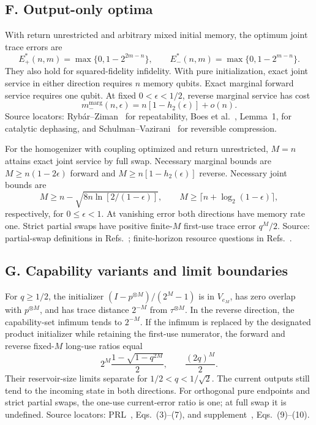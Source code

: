 \documentclass[11pt]{article}
\begin{document}
\noindent\begin{minipage}{\linewidth}
\subsection*{F. Output-only optima}
With return unrestricted and arbitrary mixed initial memory, the optimum joint trace errors are
\[
 E_+^*(n,m)=\max\{0,1-2^{2m-n}\},\qquad
 E_-^*(n,m)=\max\{0,1-2^{m-n}\}.
\]
They also hold for squared-fidelity infidelity. With pure initialization, exact joint service in either direction requires $n$ memory qubits. Exact marginal forward service requires one qubit. At fixed $0<\epsilon<1/2$, reverse marginal service has cost
\[
 m_-^{\mathrm{marg}}(n,\epsilon)=n[1-h_2(\epsilon)]+o(n).
\]
Source locators: Ryb\'{a}r--Ziman~\cite{rybar} for repeatability, Boes et al.~\cite{boes}, Lemma~1, for catalytic dephasing, and Schulman--Vazirani~\cite{sv} for reversible compression.

For the homogenizer with coupling optimized and return unrestricted, $M=n$ attains exact joint service by full swap. Necessary marginal bounds are $M\ge n(1-2\epsilon)$ forward and $M\ge n[1-h_2(\epsilon)]$ reverse. Necessary joint bounds are
\[
 M\ge n-\sqrt{8n\ln[2/(1-\epsilon)]},\qquad
 M\ge\lceil n+\log_2(1-\epsilon)\rceil,
\]
respectively, for $0\le\epsilon<1$. At vanishing error both directions have memory rate one. Strict partial swaps have positive finite-$M$ first-use trace error $q^M/2$. Source: partial-swap definitions in Refs.~\cite{ziman,scarani}; finite-horizon resource questions in Refs.~\cite{vm,beever}.


\end{minipage}
\par\medskip
\noindent\begin{minipage}{\linewidth}
\subsection*{G. Capability variants and limit boundaries}
For $q\ge1/2$, the initializer $(I-p^{\otimes M})/(2^M-1)$ is in $V_{e_M}$, has zero overlap with $p^{\otimes M}$, and has trace distance $2^{-M}$ from $\tau^{\otimes M}$. In the reverse direction, the capability-set infimum tends to $2^{-M}$. If the infimum is replaced by the designated product initializer while retaining the first-use numerator, the forward and reverse fixed-$M$ long-use ratios equal
\[
 2^M\frac{1-\sqrt{1-q^{2M}}}{2},\qquad \frac{(2q)^M}{2}.
\]
Their reservoir-size limits separate for $1/2<q<1/\sqrt2$. The current outputs still tend to the incoming state in both directions. For orthogonal pure endpoints and strict partial swaps, the one-use current-error ratio is one; at full swap it is undefined. Source locators: PRL~\cite{prl}, Eqs.~(3)--(7), and supplement~\cite{supp}, Eqs.~(9)--(10).


\end{minipage}
\end{document}
